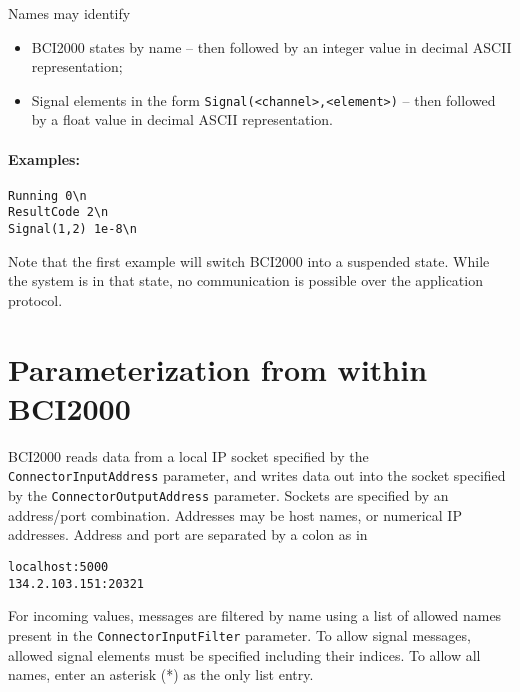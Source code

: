 \documentclass[12pt,letterpaper,notitlepage]{article}
\begin{document}
Names may identify
\begin{itemize}
\item BCI2000 states by name -- then followed
   by an integer value in decimal ASCII representation;
\item Signal elements in the form \texttt{Signal(<channel>,<element>)} --
   then followed by a float value in decimal ASCII representation.
\end{itemize}

\paragraph{Examples:}
\begin{verbatim}
Running 0\n
ResultCode 2\n
Signal(1,2) 1e-8\n
\end{verbatim}

Note that the first example will switch BCI2000 into a suspended state.
While the system is in that state, no communication is possible over the application protocol.

\section{Parameterization from within BCI2000}

BCI2000 reads data from a local IP socket specified by the 
\texttt{ConnectorInputAddress} parameter, and writes data out into the socket specified by the 
\texttt{ConnectorOutputAddress} parameter.
Sockets are specified by an address/port combination.
Addresses may be host names, or numerical IP addresses. Address and port are separated by
a colon as in
\begin{verbatim}
localhost:5000
134.2.103.151:20321
\end{verbatim}

For incoming values, messages are filtered by name using a list of allowed names 
present in the \texttt{ConnectorInputFilter} parameter. 
To allow signal messages, allowed signal elements must be specified including their
indices.
To allow all names, enter an asterisk (*) as the only list entry.
\end{document}
